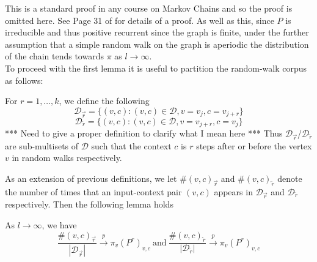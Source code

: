 \documentclass[a4paper]{article}
\newcommand{\D}{\mathcal D}
\newcommand{\rar}{\overrightarrow r}
\newcommand{\lar}{\overleftarrow r}
\begin{document}
This is a standard proof in any course on Markov Chains and so the proof is
omitted here. See Page 31 of \cite{markov_chains} for details of a proof. As
well as this, since $P$ is irreducible and thus positive recurrent since the
graph is finite, under the further assumption that a simple random walk on the
graph is aperiodic the distribution of the chain tends towards $\pi$ as
$l \to \infty$.\\
To proceed with the first lemma it is useful to partition the random-walk corpus as follows:

\begin{definition}
  For $r = 1, \dots, k$, we define the following
  \[\D_{\rar} = \{ (v, c) : (v, c) \in \D, v = v_j, c = v_{j+r}\}\]
  \[\D_{\lar} = \{ (v, c) : (v, c) \in \D, v = v_{j+r}, c = v_{j}\}\]
  *** Need to give a proper definition to clarify what I mean here ***
  Thus $\D_{\rar}$/$\D_{\lar}$ are sub-multisets of $\D$ such that the context
  $c$ is $r$ steps after or before the vertex $v$ in random walks respectively.
\end{definition}

As an extension of previous definitions, we let $\#(v, c)_{\rar}$ and $\#(v,
c)_{\lar}$ denote the number of times that an input-context pair $(v,c)$ appears
in $\D_{\rar}$ and $\D_{\lar}$ respectively. Then the following lemma holds
\begin{lemma}
  As $l \to \infty$, we have
  \[\frac{\#(v, c)_{\rar}}{|\D_{\rar}|} \overset{p}{\longrightarrow} \pi_v(P^r)_{v,c} \  \text{and}
    \ \frac{\#(v, c)_{\lar}}{|\D_{\lar}|} \overset{p}{\longrightarrow} \pi_v(P^r)_{v,c} \]
\end{lemma}
\end{document}
